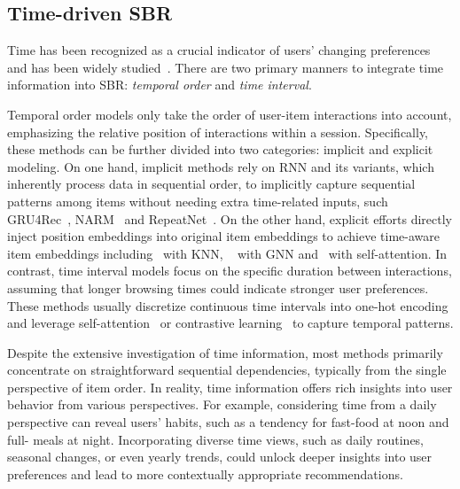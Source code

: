 \documentclass[lettersize,journal]{IEEEtran}
\begin{document}
\subsection{Time-driven SBR}\label{timesbr}
{Time} has been recognized as a crucial indicator of users' changing preferences and has been widely studied~\cite{GRU4Rec,Alexander@arXiv2017,NARM}. There are two primary manners to integrate time information into SBR: \textit{temporal order} and \textit{time interval}. 

Temporal order models only take the order of user-item interactions into account, emphasizing the relative position of interactions within a session. Specifically, these methods can be further divided into two categories: implicit and explicit modeling. On one hand, implicit methods rely on RNN and its variants, which inherently process data in sequential order, to implicitly capture sequential patterns among items without needing extra time-related inputs, such GRU4Rec~\cite{GRU4Rec}, NARM~\cite{NARM} and RepeatNet~\cite{RepeatNet}. On the other hand, explicit efforts directly inject position embeddings into original item embeddings to achieve time-aware item embeddings including~\cite{Garg@SIGIR2019} with KNN, ~\cite{LESSR,FGNN,Li@CIKM2022} with GNN and~\cite{SASRec,STAMP} with self-attention. In contrast, time interval models focus on the specific duration between interactions, assuming that longer browsing times could indicate stronger user preferences.
These methods usually discretize continuous time intervals into one-hot encoding and leverage self-attention~\cite{Li@WSDM2020, Wu@WWW2020, Chen@CIKM2022} or contrastive learning~\cite{Tian@CIKM2022,Dang@AAAI2023} to capture temporal patterns. 

Despite the extensive investigation of time information, most methods primarily concentrate on straightforward sequential dependencies, typically from the single perspective of item order. In reality, time information offers rich insights into user behavior from various perspectives. For example, considering time from a daily perspective can reveal users' habits, such as a tendency for fast-food at noon and full- meals at night. Incorporating diverse time views, such as daily routines, seasonal changes, or even yearly trends, could unlock deeper insights into user preferences and lead to more contextually appropriate recommendations.

\end{document}

